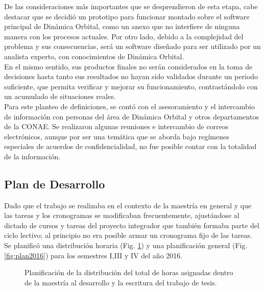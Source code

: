 De las consideraciones m\'as importantes que se desprendieron de esta etapa, cabe destacar que se decidi\'o un prototipo para funcionar montado sobre el software principal de Din\'amica Orbital, como un anexo que no interfiere de ninguna manera con los procesos actuales.
Por otro lado, debido a la complejidad del problema y sus consecuencias, ser\'a un software diseñado para ser utilizado por un analista experto, con conocimientos de Din\'amica Orbital.\\

En el mismo sentido, sus productos finales no ser\'an considerados en la toma de decisiones hasta tanto sus resultados no hayan sido validados durante un periodo suficiente, que permita verificar y mejorar su funcionamiento, contrast\'andolo con un acumulado de situaciones reales.\\

Para este planteo de definiciones, se cont\'o con el asesoramiento y el intercambio de informaci\'on con personas del \'area de Din\'amica Orbital y otros departamentos de la CONAE. Se realizaron algunas reuniones e intercambio de correos electr\'onicos, aunque por ser una tem\'atica que se aborda bajo reg\'imenes especiales de acuerdos de confidencialidad, no fue posible contar con la totalidad de la informaci\'on.

\subsection{Plan de Desarrollo}

Dado que el trabajo se realizaba en el contexto de la maestr\'ia en general y que las tareas y los cronogramas se modificaban frecuentemente, ajust\'andose al dictado de cursos y tareas del proyecto integrador que tambi\'en formaba parte del ciclo lectivo; al principio no era posible armar un cronograma fijo de las tareas. Se planific\'o una distribuci\'on horaria (Fig. \ref{fig:disths}) y una planificaci\'on general (Fig. \ref{fig:plan2016}) para los semestres I,III y IV del año 2016.

\begin{figure}[h!]
  \centering
  \caption{Planificaci\'on de la distribuci\'on del total de horas asignadas dentro de la maestr\'ia al desarrollo y la escritura del trabajo de tesis.}
  \label{fig:disths}
\end{figure}

